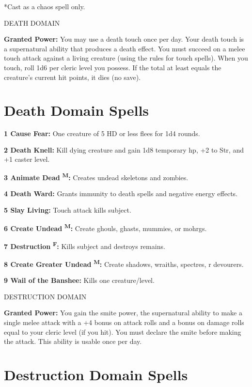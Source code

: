 \documentclass{article}
\begin{document}
*Cast as a chaos spell only.

\vspace{12pt}
DEATH DOMAIN

\textbf{Granted Power:} You may use a death touch once per day. Your death touch 
is a supernatural ability that produces a death effect. You must succeed on a melee 
touch attack against a living creature (using the rules for touch spells). When 
you touch, roll 1d6 per cleric level you possess. If the total at least equals 
the creature's current hit points, it dies (no save).

\section*{\textbf{Death Domain Spells}}

\textbf{1 Cause Fear: }One creature of 5 HD or less flees for 1d4 rounds.

\textbf{2 Death Knell:} Kill dying creature and gain 1d8 temporary hp, +2 to Str, 
and +1 caster level.

\textbf{3 Animate Dead }\textsuperscript{\textbf{M}}\textbf{:} Creates undead skeletons 
and zombies.

\textbf{4 Death Ward: }Grants immunity to death spells and negative energy effects.

\textbf{5 Slay Living: }Touch attack kills subject.

\textbf{6 Create Undead }\textsuperscript{\textbf{M}}\textbf{: }Create ghouls, 
ghasts, mummies, or mohrgs.

\textbf{7 Destruction }\textsuperscript{\textbf{F}}\textbf{:} Kills subject and 
destroys remains.

\textbf{8 Create Greater Undead }\textsuperscript{\textbf{M}}\textbf{:} Create 
shadows, wraiths, spectres, r devourers.

\textbf{9 Wail of the Banshee: }Kills one creature/level.

\vspace{12pt}
DESTRUCTION DOMAIN

\textbf{Granted Power:} You gain the smite power, the supernatural ability to make 
a single melee attack with a +4 bonus on attack rolls and a bonus on damage rolls 
equal to your cleric level (if you hit). You must declare the smite before making 
the attack. This ability is usable once per day.

\section*{\textbf{Destruction Domain Spells}}
\end{document}

